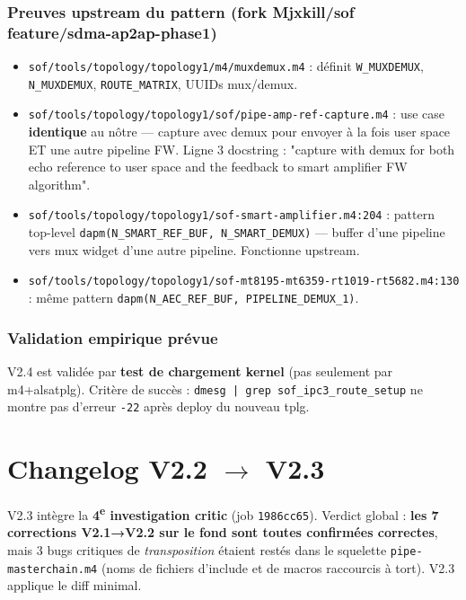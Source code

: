 \documentclass[11pt,a4paper]{article}
\begin{document}
\subsubsection*{Preuves upstream du pattern (fork Mjxkill/sof feature/sdma-ap2ap-phase1)}

\begin{itemize}[leftmargin=*, itemsep=1pt]
  \item \texttt{sof/tools/topology/topology1/m4/muxdemux.m4} : définit \texttt{W\_MUXDEMUX}, \texttt{N\_MUXDEMUX}, \texttt{ROUTE\_MATRIX}, UUIDs mux/demux.
  \item \texttt{sof/tools/topology/topology1/sof/pipe-amp-ref-capture.m4} : use case \textbf{identique} au nôtre --- capture avec demux pour envoyer à la fois user space ET une autre pipeline FW. Ligne 3 docstring : "capture with demux for both echo reference to user space and the feedback to smart amplifier FW algorithm".
  \item \texttt{sof/tools/topology/topology1/sof-smart-amplifier.m4:204} : pattern top-level \texttt{dapm(N\_SMART\_REF\_BUF, N\_SMART\_DEMUX)} --- buffer d'une pipeline vers mux widget d'une autre pipeline. Fonctionne upstream.
  \item \texttt{sof/tools/topology/topology1/sof-mt8195-mt6359-rt1019-rt5682.m4:130} : même pattern \texttt{dapm(N\_AEC\_REF\_BUF, PIPELINE\_DEMUX\_1)}.
\end{itemize}

\subsubsection*{Validation empirique prévue}

V2.4 est validée par \textbf{test de chargement kernel} (pas seulement par m4+alsatplg). Critère de succès : \texttt{dmesg | grep sof\_ipc3\_route\_setup} ne montre pas d'erreur \texttt{-22} après deploy du nouveau tplg.

\clearpage

\section*{Changelog V2.2 $\rightarrow$ V2.3}

V2.3 intègre la \textbf{4\textsuperscript{e} investigation critic} (job \texttt{1986cc65}). Verdict global : \textbf{les 7 corrections V2.1→V2.2 sur le fond sont toutes confirmées correctes}, mais 3 bugs critiques de \emph{transposition} étaient restés dans le squelette \texttt{pipe-masterchain.m4} (noms de fichiers d'include et de macros raccourcis à tort). V2.3 applique le diff minimal.
\end{document}
